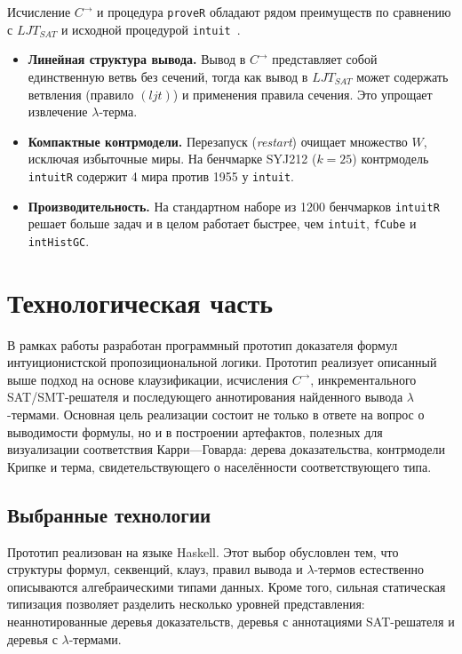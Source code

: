 \documentclass[14pt, russian]{scrartcl}
\begin{document}
Исчисление $C^{\rightarrow}$ и процедура \texttt{proveR} обладают рядом
преимуществ по сравнению с $LJT_{SAT}$ и исходной процедурой
\texttt{intuit}~\cite{ClaessenRosen2015}.

\begin{itemize}
\item \textbf{Линейная структура вывода.} Вывод в $C^{\rightarrow}$
  представляет собой единственную ветвь без сечений, тогда как вывод в
  $LJT_{SAT}$ может содержать ветвления (правило $(ljt)$) и применения правила
  сечения. Это упрощает извлечение $\lambda$-терма.
\item \textbf{Компактные контрмодели.} Перезапуск (\emph{restart}) очищает
  множество $W$, исключая избыточные миры. На бенчмарке SYJ212 ($k = 25$)
  контрмодель \texttt{intuitR} содержит 4 мира против 1955 у \texttt{intuit}.
\item \textbf{Производительность.} На стандартном наборе из 1200 бенчмарков
  \texttt{intuitR} решает больше задач и в целом работает быстрее, чем
  \texttt{intuit}, \texttt{fCube} и \texttt{intHistGC}.
\end{itemize}

\section{Технологическая часть}

В рамках работы разработан программный прототип доказателя формул
интуиционистской пропозициональной логики. Прототип реализует описанный выше
подход на основе клаузификации, исчисления $C^{\rightarrow}$, инкрементального
SAT/SMT-решателя и последующего аннотирования найденного вывода
$\lambda$-термами. Основная цель реализации состоит не только в ответе на
вопрос о выводимости формулы, но и в построении артефактов, полезных для
визуализации соответствия Карри---Говарда: дерева доказательства, контрмодели
Крипке и терма, свидетельствующего о населённости соответствующего типа.

\subsection{Выбранные технологии}

Прототип реализован на языке Haskell. Этот выбор обусловлен тем, что структуры
формул, секвенций, клауз, правил вывода и $\lambda$-термов естественно
описываются алгебраическими типами данных. Кроме того, сильная статическая
типизация позволяет разделить несколько уровней представления: неаннотированные
деревья доказательств, деревья с аннотациями SAT-решателя и деревья с
$\lambda$-термами.
\end{document}
